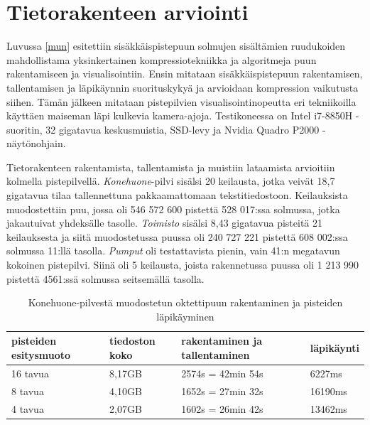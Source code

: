 \section{Tietorakenteen arviointi}\label{tulokset}

Luvussa \ref{mun} esitettiin sisäkkäispistepuun solmujen sisältämien ruudukoiden mahdollistama yksinkertainen kompressiotekniikka ja algoritmeja puun rakentamiseen ja visualisointiin. Ensin mitataan sisäkkäispistepuun rakentamisen, tallentamisen ja läpikäynnin suorituskykyä ja arvioidaan kompression vaikutusta siihen. Tämän jälkeen mitataan pistepilvien visualisointinopeutta eri tekniikoilla käyttäen maiseman läpi kulkevia kamera-ajoja. Testikoneessa on Intel i7-8850H -suoritin, 32 gigatavua keskusmuistia, SSD-levy ja Nvidia Quadro P2000 -näytönohjain.  

Tietorakenteen rakentamista, tallentamista ja muistiin lataamista arvioitiin kolmella pistepilvellä. \emph{Konehuone}-pilvi sisälsi 20 keilausta, jotka veivät 18,7 gigatavua tilaa tallennettuna pakkaamattomaan tekstitiedostoon. Keilauksista muodostettiin puu, jossa oli 546 572 600 pistettä 528 017:ssa solmussa, jotka jakautuivat yhdeksälle tasolle. \emph{Toimisto} sisälsi 8,43 gigatavua pisteitä 21 keilauksesta ja siitä muodostetussa puussa oli 240 727 221 pistettä 608 002:ssa solmussa 11:llä tasolla. \emph{Pumput} oli testattavista pienin, vain 41:n megatavun kokoinen pistepilvi. Siinä oli 5 keilausta, joista rakennetussa puussa oli 1 213 990 pistettä 4561:ssä solmussa seitsemällä tasolla.  

\begin{table}[h]
    \begin{tabular}{|l|l|l|l|}
    \hline
    \textbf{pisteiden esitysmuoto} & \textbf{tiedoston koko} & \textbf{rakentaminen ja tallentaminen} & \textbf{läpikäynti} \\ \hline
    16 tavua       & 8,17GB             & 2574s = 42min 54s              & 6227ms     \\
    8 tavua        & 4,10GB             & 1652s = 27min 32s             & 16190ms    \\
    4 tavua        & 2,07GB             & 1602s = 26min 42s             & 13462ms    \\ \hline
    \end{tabular}
    \caption{Konehuone-pilvestä muodostetun oktettipuun rakentaminen ja pisteiden läpikäyminen}
    \label{taulukko:konehuone}
\end{table}


